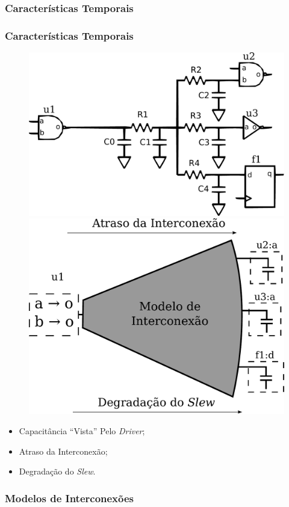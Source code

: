 \documentclass[10pt,a4paper]{beamer}
\begin{document}
			\subsubsection*{Características Temporais}
			\begin{frame}
				\frametitle{Características Temporais}
				
				
					\begin{figure}
						\subfigure
						{
						\includegraphics[width=0.4 \textwidth]{img/modelagem1.pdf}
						}
						\subfigure
						{
						\includegraphics[width=0.4 \textwidth]{img/modelagem2.pdf}
						}
						
					\end{figure}
					\begin{itemize}
						\item Capacitância ``Vista'' Pelo \textit{Driver};
						\item Atraso da Interconexão;
						\item Degradação do \textit{Slew}. 		
					\end{itemize}
			\end{frame}
			
			\subsubsection*{Modelos de Interconexões}
%					
%					
				
\end{document}
